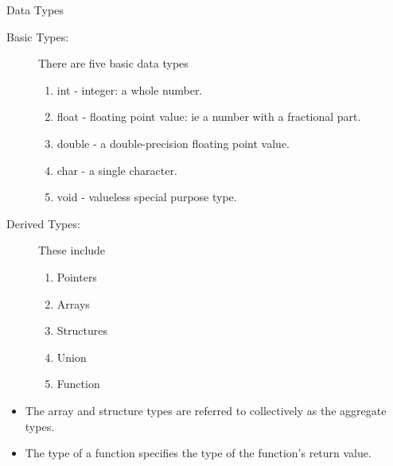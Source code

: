 \documentclass[10pt,t]{beamer}
\begin{document}
\begin{frame}{Data Types}
  \begin{description}
    \item[Basic Types:] There are five basic data types
      \begin{enumerate}
        \item int - integer: a whole number.
        \item float - floating point value: ie a number with a fractional part.
        \item double - a double-precision floating point value.
        \item char -  a single character.
        \item void - valueless special purpose type.
      \end{enumerate}
    \item[Derived Types:] These include
      \begin{enumerate}
        \item Pointers
        \item Arrays
        \item Structures
        \item Union
        \item Function
      \end{enumerate}
  \end{description}
  \begin{itemize}
    \item The array and structure types are referred to collectively as the aggregate types. 
    \item The type of a function specifies the type of the function's return value.
  \end{itemize}
\end{frame}
\end{document}
